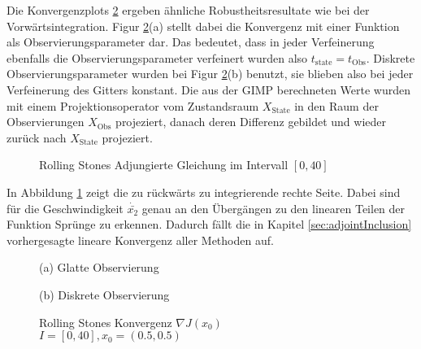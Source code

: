 Die Konvergenzplots \ref{fig:rollingStonesAdjoint} ergeben ähnliche Robustheitsresultate wie bei der Vorwärtsintegration. Figur \ref{fig:rollingStonesAdjoint}(a) stellt dabei die Konvergenz mit einer Funktion als Observierungsparameter dar. Das bedeutet, dass in jeder Verfeinerung ebenfalls die Observierungsparameter verfeinert wurden also $t_{\text{state}} = t_{\text{Obs}}$. Diskrete Observierungsparameter wurden bei Figur \ref{fig:rollingStonesAdjoint}(b) benutzt, sie blieben also bei jeder Verfeinerung des Gitters konstant. Die aus der GIMP berechneten Werte wurden mit einem Projektionsoperator vom Zustandsraum $X_{\text{State}}$ in den Raum der Observierungen $X_{\text{Obs}}$ projeziert, danach deren Differenz gebildet und wieder zurück nach $X_{\text{State}}$ projeziert.
\begin{figure}[H]
\centering

\caption{Rolling Stones Adjungierte Gleichung im Intervall $[0,40]$}
\label{fig:rolling_adjoint_eq}
\end{figure}
In Abbildung \ref{fig:rolling_adjoint_eq} zeigt die zu rückwärts zu integrierende rechte Seite. Dabei sind für die Geschwindigkeit $\dot{\bar{x_2}}$ genau an den Übergängen zu den linearen Teilen der Funktion Sprünge zu erkennen. Dadurch fällt die in Kapitel \ref{sec:adjointInclusion} vorhergesagte lineare Konvergenz aller Methoden auf.


\begin{figure}[H]
\footnotesize 
\centering
\begin{minipage}[b]{0.49\linewidth}

\caption*{(a) Glatte Observierung}
\end{minipage}
\begin{minipage}[b]{0.49\linewidth}

\caption*{(b) Diskrete Observierung}
\label{fig:rollingStonesAdjointDiscrete}
\end{minipage}
\caption{Rolling Stones Konvergenz $\nabla J(x_0)$\\ $I=[0,40],x_0=(0.5,0.5)$}
\label{fig:rollingStonesAdjoint}
\end{figure}

